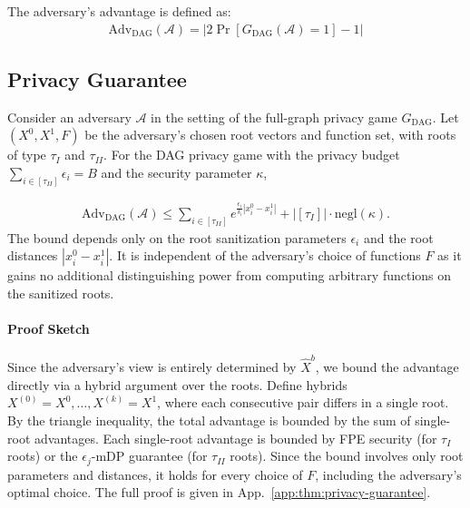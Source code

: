 \medskip
The adversary's advantage is defined as: 
\begin{align}
\label{alg:full-dag-adv}
    \mathrm{Adv}_{\mathrm{DAG}}(\mathcal{A}) = |2\Pr[G_{\mathrm{DAG}}(\mathcal{A}) = 1] - 1|
\end{align}



\subsection{Privacy Guarantee}

\begin{theorem} Consider an adversary $\mathcal{A}$ in the setting of the full-graph privacy game $G_{\mathrm{DAG}}$. Let $(X^0, X^1, F)$ be the adversary's chosen root vectors and function set, with roots of type $\tau_I$ and $\tau_{II}$. For the DAG privacy game with the privacy budget $\sum_{i\in[\tau_{II}]} \epsilon_i = B$ and the security parameter $\kappa$, 

\begin{align}
    \mathrm{Adv}_{\mathrm{DAG}}(\mathcal{A}) \leq \sum_{i\in[\tau_{II}]} e^{\frac{\epsilon_i}{\delta_i}|x^0_i - x^1_i|} + \big|[\tau_{I}]\big|\cdot\mathrm{negl}(\kappa).
\end{align}
\label{thm:privacy-guarantee}
The bound depends only on the root sanitization parameters $\epsilon_i$ and the root distances $|x^0_i - x^1_i|$. It is independent of the adversary's choice of functions $F$ as it gains no additional distinguishing power from computing arbitrary functions on the sanitized roots.
\end{theorem}

\paragraph{Proof Sketch} Since the adversary's view is entirely determined by $\hat{X}^b$, we bound the advantage directly via a hybrid argument over the roots. Define hybrids $X^{(0)} = X^0, \ldots, X^{(k)} = X^1$, where each consecutive pair differs in a single root. By the triangle inequality, the total advantage is bounded by the sum of single-root advantages. Each single-root advantage is bounded by FPE security (for $\tau_I$ roots) or the $\epsilon_j$-mDP guarantee (for $\tau_{II}$ roots). Since the bound involves only root parameters and distances, it holds for every choice of $F$, including the adversary's optimal choice. The full proof is given in App.~\ref{app:thm:privacy-guarantee}.
 

